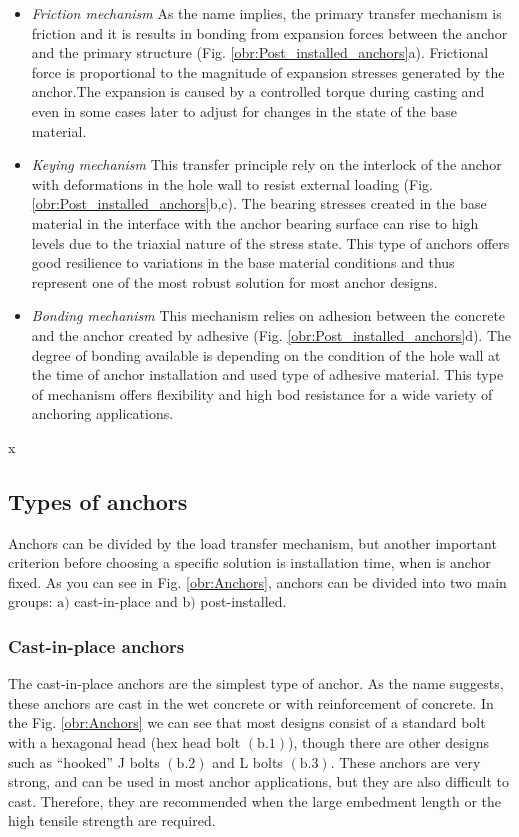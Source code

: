 \begin{itemize}
	\item \textit{Friction mechanism}
	As the name implies, the primary transfer mechanism is friction and it is results in bonding from expansion forces between the anchor and the primary structure (Fig. \ref{obr:Post_installed_anchors}a). Frictional force is proportional to the magnitude of expansion stresses generated by the anchor.The expansion is caused by a controlled torque during casting and even in some cases later to adjust for changes in the state of the base material.
	
	\item \textit{Keying mechanism}
	This transfer principle rely on the interlock of the anchor with deformations in the hole wall to resist external loading (Fig. \ref{obr:Post_installed_anchors}b,c). The bearing stresses created in the base material in the interface with the anchor bearing surface can rise to high levels due to the triaxial nature of the stress state. This type of anchors offers good resilience to variations in the base material conditions and thus represent one of the most robust solution for most anchor designs. 
	
	\item \textit{Bonding mechanism}
	This mechanism relies on adhesion between the concrete and the anchor created by adhesive (Fig. \ref{obr:Post_installed_anchors}d). The degree of bonding available is depending on the condition of the hole wall at the time of anchor installation and used type of adhesive material. This type of mechanism offers flexibility and high bod resistance for a wide variety of anchoring applications. 
\end{itemize}


x


\newpage
\subsection{Types of anchors}
\indent

Anchors can be divided by the load transfer mechanism, but another important criterion before choosing a specific solution is installation time, when is anchor fixed. As you can see in Fig. \ref{obr:Anchors}, anchors can be divided into two main groups: $\mathrm{a)}$ cast-in-place and $\mathrm{b)}$ post-installed. 


\subsubsection{Cast-in-place anchors}
The cast-in-place anchors are the simplest type of anchor. As the name suggests, these anchors are cast in the wet concrete or with reinforcement of concrete. In the Fig. \ref{obr:Anchors} we can see that most designs consist of a standard bolt with a hexagonal head (hex head bolt $\mathrm{(b.1)}$), though there are other designs such as “hooked” J bolts  $\mathrm{(b.2)}$ and L bolts $\mathrm{(b.3)}$. These anchors are very strong, and can be used in most anchor applications, but they are also difficult to cast. Therefore, they are recommended when the large embedment length or the  high tensile strength are required.

